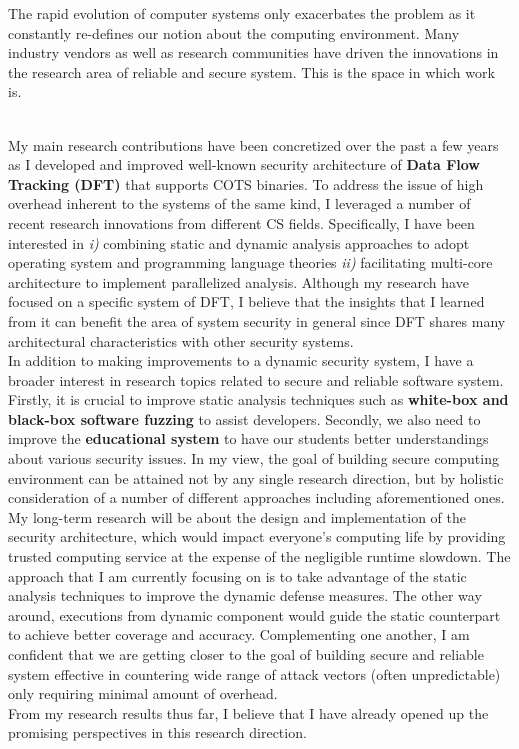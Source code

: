\documentclass[letterpaper, 10pt]{article}
\begin{document}
The rapid evolution of computer systems only exacerbates the problem as it
constantly re-defines our notion about the computing environment. Many industry
vendors as well as research communities have driven the innovations in the
research area of reliable and secure system. This is the space in which work
is. \\ 

My main research contributions have been concretized over the past a few years
as I developed and improved well-known security architecture of {\bf Data Flow
Tracking (DFT)} that supports COTS binaries. To address the issue of high
overhead inherent to the systems of the same kind, I leveraged a number of
recent research innovations from different CS fields. Specifically, I have been
interested in {\it i)} combining static and dynamic analysis approaches to
adopt operating system and programming language theories {\it ii)} facilitating
multi-core architecture to implement parallelized analysis. Although my
research have focused on a specific system of DFT, I believe that the insights
that I learned from it can benefit the area of system security in general since
DFT shares many architectural characteristics with other security systems. \\

In addition to making improvements to a dynamic security system, I have a
broader interest in research topics related to secure and reliable software
system. Firstly, it is crucial to improve static analysis techniques such as
{\bf white-box and black-box software fuzzing} to assist developers. Secondly,
we also need to improve the {\bf educational system} to have our students
better understandings about various security issues. In my view, the goal of
building secure computing environment can be attained not by any single
research direction, but by holistic consideration of a number of different
approaches including aforementioned ones. \\

My long-term research will be about the design and implementation of the
security architecture, which would impact everyone’s computing life by
providing trusted computing service at the expense of the negligible runtime
slowdown. The approach that I am currently focusing on is to take advantage of
the static analysis techniques to improve the dynamic defense measures. The
other way around, executions from dynamic component would guide the static
counterpart to achieve better coverage and accuracy. Complementing one another,
I am confident that we are getting closer to the goal of building secure and
reliable system effective in countering wide range of attack vectors (often
unpredictable) only requiring minimal amount of overhead. \\

From my research results thus far, I believe that I have already opened up the
promising perspectives in this research direction. 
\end{document}
